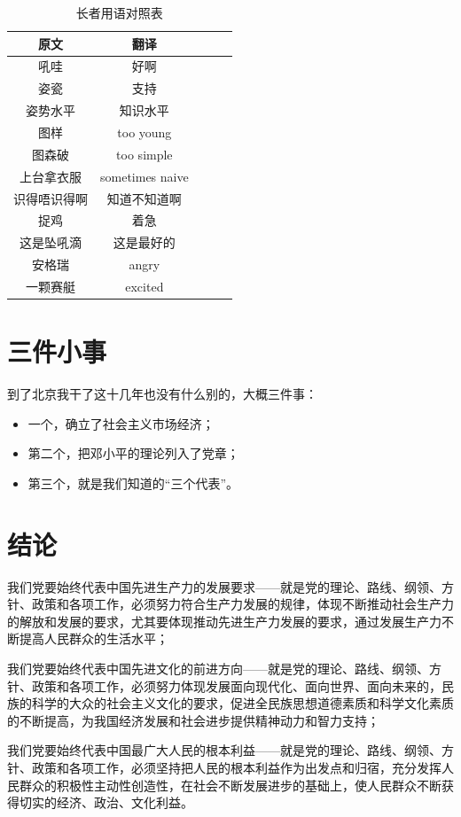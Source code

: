 \begin{table}[htbp]
	\caption{长者用语对照表}\label{table}
	\vspace{0.5em}\centering\wuhao
	\begin{tabular}{ccccc}
		\toprule[1.5pt]
		原文 & 翻译 \\
		\midrule[1pt]
		吼哇 & 好啊 \\
		姿瓷 & 支持 \\
		姿势水平 & 知识水平 \\
		图样 & too young \\
		图森破 & too simple \\
		上台拿衣服 & sometimes naive \\
		识得唔识得啊 & 知道不知道啊 \\
		捉鸡 & 着急 \\
		这是坠吼滴 & 这是最好的 \\
		安格瑞 & angry \\
		一颗赛艇 & excited \\
		\bottomrule[1.5pt]
	\end{tabular}
	\vspace{\baselineskip}
\end{table}


\section{三件小事}
到了北京我干了这十几年也没有什么别的，大概三件事：

\begin{itemize}
	\item 一个，确立了社会主义市场经济；
	\item 第二个，把邓小平的理论列入了党章；
	\item 第三个，就是我们知道的“三个代表”。
\end{itemize}

\section{结论}
我们党要始终代表中国先进生产力的发展要求——就是党的理论、路线、纲领、方针、政策和各项工作，必须努力符合生产力发展的规律，体现不断推动社会生产力的解放和发展的要求，尤其要体现推动先进生产力发展的要求，通过发展生产力不断提高人民群众的生活水平；

我们党要始终代表中国先进文化的前进方向——就是党的理论、路线、纲领、方针、政策和各项工作，必须努力体现发展面向现代化、面向世界、面向未来的，民族的科学的大众的社会主义文化的要求，促进全民族思想道德素质和科学文化素质的不断提高，为我国经济发展和社会进步提供精神动力和智力支持；

我们党要始终代表中国最广大人民的根本利益——就是党的理论、路线、纲领、方针、政策和各项工作，必须坚持把人民的根本利益作为出发点和归宿，充分发挥人民群众的积极性主动性创造性，在社会不断发展进步的基础上，使人民群众不断获得切实的经济、政治、文化利益。